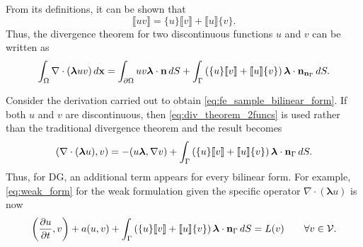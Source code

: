 \documentclass[oneside,a4paper,11pt]{report}
\begin{document}
From its definitions, it can be shown that
\begin{equation}
    \llbracket uv \rrbracket = \{ u \} \llbracket v \rrbracket + \llbracket u \rrbracket \{ v \}.
\end{equation}
Thus, the divergence theorem for two discontinuous functions $u$ and $v$ can be written as
\begin{equation}
    \label{eq:div_theorem_2funcs}
    \int_\Omega \nabla \cdot (\bm \lambda uv) \, d\mathbf{x} = \int_{\partial \Omega} uv \bm \lambda \cdot \mathbf{n} \, dS + \int_{\Gamma} \left ( \{ u \} \llbracket v \rrbracket + \llbracket u \rrbracket \{ v \} \right )\bm \lambda \cdot \mathbf{n}_{\mathbf{n}_\Gamma} \, dS.
\end{equation}

Consider the derivation carried out to obtain \cref{eq:fe_sample_bilinear_form}. If both $u$ and $v$ are discontinuous, then \cref{eq:div_theorem_2funcs} is used rather than the traditional divergence theorem and the result becomes
\begin{equation}
    \label{eq:from_strong_to_weak_form}
    (\nabla \cdot(\boldsymbol{\lambda}u),v) = -(u\boldsymbol{\lambda},\nabla v) + \int_{\Gamma} \left ( \{u\} \llbracket v \rrbracket + \llbracket u \rrbracket \{v\} \right ) \bm \lambda \cdot \mathbf{n}_{\Gamma} \, dS.
\end{equation}
Thus, for DG, an additional term appears for every bilinear form. For example, \cref{eq:weak_form} for the weak formulation given the specific operator $\nabla \cdot (\boldsymbol{\lambda} u)$ is now
\begin{equation}
        \left ( \frac{\partial u}{\partial t} , v \right ) + a(u,v)  + \int_{\Gamma} \left ( \{ u \} \llbracket v \rrbracket + \llbracket u \rrbracket \{ v \} \right ) \bm \lambda \cdot \mathbf{n}_{\Gamma} \, dS = L(v) \qquad \forall v \in \mathcal{V} .
\end{equation}
\end{document}
